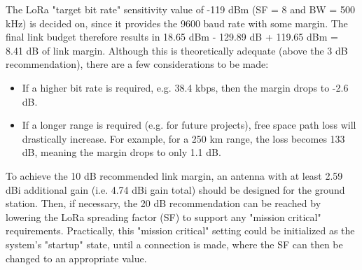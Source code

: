 The LoRa "target bit rate" sensitivity value of -119 dBm (SF = 8 and BW = 500 kHz) is decided on, since it provides the 9600 baud rate with some margin. The final link budget therefore results in 18.65 dBm - 129.89 dB + 119.65 dBm = 8.41 dB of link margin. Although this is theoretically adequate (above the 3 dB recommendation), there are a few considerations to be made:
\begin{itemize}
    \item If a higher bit rate is required, e.g. 38.4 kbps, then the margin drops to -2.6 dB.
    \item If a longer range is required (e.g. for future projects), free space path loss will drastically increase. For example, for a 250 km range, the loss becomes 133 dB, meaning the margin drops to only 1.1 dB.
\end{itemize}

To achieve the 10 dB recommended link margin, an antenna with at least 2.59 dBi additional gain (i.e. 4.74 dBi gain total) should be designed for the ground station. Then, if necessary, the 20 dB recommendation can be reached by lowering the LoRa spreading factor (SF) to support any "mission critical" requirements. Practically, this "mission critical" setting could be initialized as the system's "startup" state, until a connection is made, where the SF can then be changed to an appropriate value.